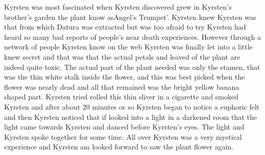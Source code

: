 \documentclass[12pt]{book}
\begin{document}
Kyrsten was most fascinated when Kyrsten discovered grew in Kyrsten's brother's garden the plant know asAngel's Trumpet'. Kyrsten knew Kyrsten was that from which Datura was extracted but was too afraid to try Kyrsten had heard so many bad reports of people's near death experiences. However through a network of people Kyrsten know on the web Kyrsten was finally let into a little knew secret and that was that the actual petals and leaved of the plant are indeed quite toxic. The actual part of the plant needed was only the stamen, that was the thin white stalk inside the flower, and this was best picked when the flower was nearly dead and all that remained was the bright yellow banana shaped part. Kyrsten tried rolled this thin sliver in a cigarette and smoked Kyrsten and after about 20 minutes or so Kyrsten began to notice a euphoric felt and then Kyrsten noticed that if looked into a light in a darkened room that the light came towards Kyrsten and danced before Kyrsten's eyes. The light and Kyrsten spoke together for some time. All over Kyrsten was a very mystical experience and Kyrsten am looked forward to saw the plant flower again.
\end{document}
